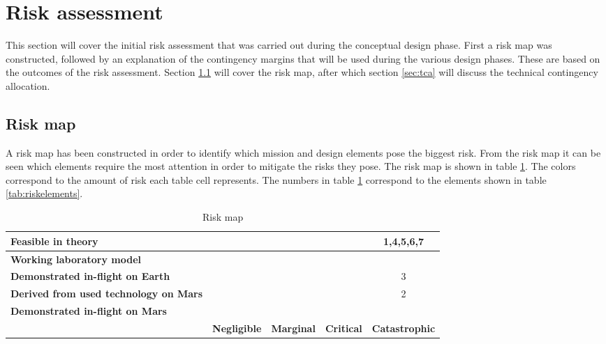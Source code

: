 \section{Risk assessment} 
\label{ch:risk}
This section will cover the initial risk assessment that was carried out during the conceptual design phase. First a risk map was constructed, followed by an explanation of the contingency margins that will be used during the various design phases. These are based on the outcomes of the risk assessment. Section \ref{sec:riskmap} will cover the risk map, after which section \ref{sec:tca} will discuss the technical contingency allocation.

\subsection{Risk map}
\label{sec:riskmap}
 A risk map has been constructed in order to identify which mission and design elements pose the biggest risk. From the risk map it can be seen which elements require the most attention in order to mitigate the risks they pose. The risk map is shown in table \ref{tab:riskmap}. The colors correspond to the amount of risk each table cell represents. The numbers in table \ref{tab:riskmap} correspond to the elements shown in table \ref{tab:riskelements}.

\begin{table}[h]
\centering
\caption{Risk map}
\label{tab:riskmap}
    \begin{tabular}{|p{6.5cm}|c|c|c|c|}
    \hline
    \textbf{Feasible in theory} & \cellcolor{green} & \cellcolor{yellow} & \cellcolor{red} & \cellcolor{red} 1,4,5,6,7 \\ \hline
    \textbf{Working laboratory model} & \cellcolor{green} & \cellcolor{yellow} & \cellcolor{red} & \cellcolor{red} \\ \hline
    \textbf{Demonstrated in-flight on Earth} & \cellcolor{green} & \cellcolor{yellow} & \cellcolor{yellow} & \cellcolor{yellow} 3 \\ \hline
    \textbf{Derived from used technology on Mars} & \cellcolor{green} & \cellcolor{yellow} & \cellcolor{yellow} & \cellcolor{yellow} 2 \\ \hline
    \textbf{Demonstrated in-flight on Mars} & \cellcolor{green} & \cellcolor{green} & \cellcolor{green} & \cellcolor{green} \\ \hline
     & \textbf{Negligible} & \textbf{Marginal} & \textbf{Critical} & \textbf{Catastrophic} \\ \hline
    \end{tabular}
\end{table}

